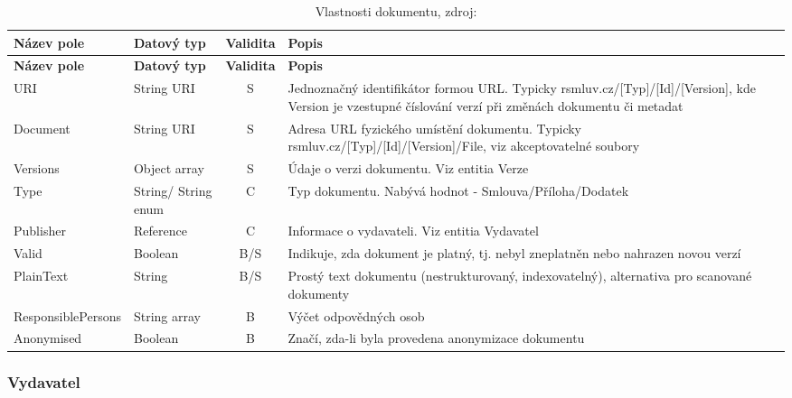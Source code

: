\begin{center}
\begin{longtable}{lp{20mm}cp{65mm}}
\label{grid_mlmmh} \\
\multicolumn{1}{l}{\textbf{Název pole}} & 
\multicolumn{1}{l}{\textbf{Datový typ}} & 
\multicolumn{1}{l}{\textbf{Validita}} & 
\multicolumn{1}{l}{\textbf{Popis}} \\ \hline 
\endfirsthead
\multicolumn{1}{l}{\textbf{Název pole}} & 
\multicolumn{1}{l}{\textbf{Datový typ}} & 
\multicolumn{1}{l}{\textbf{Validita}} & 
\multicolumn{1}{l}{\textbf{Popis}} \\ \hline 
\hline
\endhead
\endfoot
\caption[Vlastnosti dokumentu]{Vlastnosti dokumentu, zdroj:\cite{metodika, standard}}
\endlastfoot
\rowcolor{validateS}URI & String URI & S & Jednoznačný identifikátor formou URL. Typicky rsmluv.cz/[Typ]/[Id]/[Version], kde Version je vzestupné číslování verzí při změnách dokumentu či metadat \\
\rowcolor{validateS}Document & String URI & S & Adresa URL fyzického umístění dokumentu. Typicky rsmluv.cz/[Typ]/[Id]/[Version]/File, viz akceptovatelné soubory \\
\rowcolor{validateS}Versions & Object array & S & Údaje o verzi dokumentu. Viz entitia Verze \\
\rowcolor{validateC}Type & String/ String enum & C & Typ dokumentu. Nabývá hodnot - Smlouva/Příloha/Dodatek \\
\rowcolor{validateC}Publisher & Reference & C & Informace o vydavateli. Viz entitia Vydavatel \\
\rowcolor{validateB}Valid & Boolean & B/S & Indikuje, zda dokument je platný, tj. nebyl zneplatněn nebo nahrazen novou verzí \\
\rowcolor{validateB}PlainText & String & B/S & Prostý text dokumentu (nestrukturovaný, indexovatelný), alternativa pro scanované dokumenty \\
\rowcolor{validateB}ResponsiblePersons & String array & B & Výčet odpovědných osob \\
\rowcolor{validateB}Anonymised & Boolean & B & Značí, zda-li byla provedena anonymizace dokumentu \\
\end{longtable}
\end{center}

\subsubsection*{Vydavatel}

